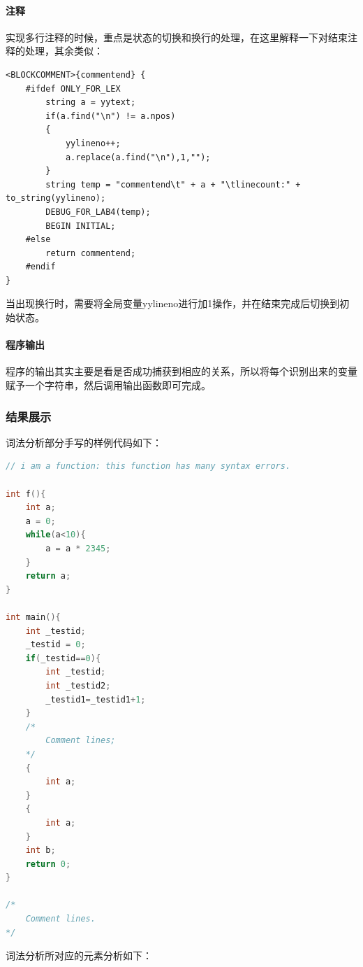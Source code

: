 \documentclass[UTF8,a4paper,10pt]{ctexart}
\begin{document}
\paragraph{注释}
实现多行注释的时候，重点是状态的切换和换行的处理，在这里解释一下对结束注释的处理，其余类似：
\begin{lstlisting}[title = 结束注释的处理]
<BLOCKCOMMENT>{commentend} {
    #ifdef ONLY_FOR_LEX
        string a = yytext;
        if(a.find("\n") != a.npos)
        {
            yylineno++;
            a.replace(a.find("\n"),1,"");
        }
        string temp = "commentend\t" + a + "\tlinecount:" + to_string(yylineno);
        DEBUG_FOR_LAB4(temp);
        BEGIN INITIAL;
    #else 
        return commentend;
    #endif
}
\end{lstlisting}
当出现换行时，需要将全局变量yylineno进行加1操作，并在结束完成后切换到初始状态。

\paragraph{程序输出}
程序的输出其实主要是看是否成功捕获到相应的关系，所以将每个识别出来的变量赋予一个字符串，然后调用输出函数即可完成。



\subsubsection{结果展示}

词法分析部分手写的样例代码如下：

\begin{lstlisting}[title = 词法分析样例代码, language = c++]
// i am a function: this function has many syntax errors.

int f(){
	int a;
	a = 0;
	while(a<10){
		a = a * 2345;
	}
	return a;
}

int main(){
	int _testid;
	_testid = 0;
	if(_testid==0){
		int _testid;
		int _testid2;
		_testid1=_testid1+1;
	}
	/*
		Comment lines;
	*/
	{
		int a;
	}
	{
		int a;
	}
	int b;
	return 0;
}

/*
	Comment lines.
*/
\end{lstlisting}

词法分析所对应的元素分析如下：
\end{document}
